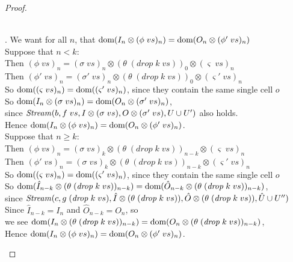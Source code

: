 \begin{proof}
\begin{enumerate}
\begin{tabbedproof}
  \\ . We want for all $n$, that $\mbox{dom}({I_n \otimes (\phi\;vs)_n}) = \mbox{dom}({O_n \otimes (\phi'\;vs)_n})$ \\
  \ooo Suppose that $n < k$: \\
  \oooo Then $(\phi\;vs)_n = (\sigma\;vs)_n \otimes (\theta\;(\mathit{drop}\;k\;vs))_0 \otimes (\varsigma\;vs)_n$ \\
  \oooo Then $(\phi'\;vs)_n = (\sigma'\;vs)_n \otimes (\theta\;(\mathit{drop}\;k\;vs))_0 \otimes (\varsigma'\;vs)_n$ \\
  \oooo So $\mbox{dom}({(\varsigma\;vs)_n}) = \mbox{dom}({(\varsigma'\;vs)_n})$, since they contain the same single cell $o$ \\
  \oooo So $\mbox{dom}({I_n \otimes (\sigma\;vs)_n}) = \mbox{dom}({O_n \otimes (\sigma'\;vs)_n})$, \\
  \oooox since  $\mathit{Stream}(b, f\;vs, I \otimes (\sigma\;vs), O \otimes (\sigma'\;vs), U \cup U')$ also holds. \\ 
  \oooo Hence $\mbox{dom}({I_n \otimes (\phi\;vs)_n})  = \mbox{dom}({O_n \otimes (\phi'\;vs)_n})$. \\ 
  \ooo Suppose that $n \geq k$: \\   
  \oooo Then $(\phi\;vs)_n  = (\sigma\;vs)_k \otimes (\theta\;(\mathit{drop}\;k\;vs))_{n-k} \otimes (\varsigma\;vs)_n$ \\
  \oooo Then $(\phi'\;vs)_n = (\sigma\;vs)_k \otimes (\theta\;(\mathit{drop}\;k\;vs))_{n-k} \otimes (\varsigma'\;vs)_n$ \\
  \oooo So $\mbox{dom}({(\varsigma\;vs)_n}) = \mbox{dom}({(\varsigma'\;vs)_n})$, since they contain the same single cell $o$ \\
  \oooo So $\mbox{dom}({\hat{I}_{n-k} \otimes (\theta\;(\mathit{drop}\;k\;vs))_{n-k}}) = \mbox{dom}({\hat{O}_{n-k} \otimes (\theta\;(\mathit{drop}\;k\;vs))_{n-k}})$, \\
  \oooox since  $\mathit{Stream}(c, g\;(\mathit{drop}\;k\;vs), \hat{I} \otimes (\theta\;(\mathit{drop}\;k\;vs)), \hat{O} \otimes (\theta\;(\mathit{drop}\;k\;vs)), \hat{U} \cup U'')$ \\ 
  \oooo Since $\hat{I}_{n-k} = I_n$ and $\hat{O}_{n-k} = O_n$, so \\
  \oooo we see $\mbox{dom}({I_n \otimes (\theta\;(\mathit{drop}\;k\;vs))_{n-k}}) = \mbox{dom}({O_n \otimes (\theta\;(\mathit{drop}\;k\;vs))_{n-k}})$, \\
  \oooo Hence $\mbox{dom}({I_n \otimes (\phi\;vs)_n})  = \mbox{dom}({O_n \otimes (\phi'\;vs)_n})$. \\ 


\end{tabbedproof}
\end{enumerate}
\end{proof}
